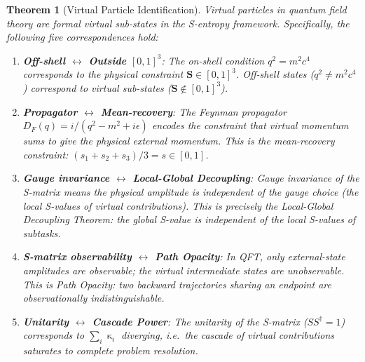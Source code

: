 \documentclass[twocolumn,10pt,a4paper]{article}
\theoremstyle{thmstyle}
\newtheorem{theorem}{Theorem}[section]
\theoremstyle{definition}
\theoremstyle{remark}
\DeclareMathOperator{\catpow}{\kappa}
\begin{document}
\begin{theorem}[Virtual Particle Identification]
\label{thm:virtual-id}
Virtual particles in quantum field theory are formal virtual sub-states
in the S-entropy framework. Specifically, the following five
correspondences hold:
\begin{enumerate}[leftmargin=1.5em,label=(\roman*),itemsep=0.2em]
\item \textbf{Off-shell $\leftrightarrow$ Outside $[0,1]^3$}: The
on-shell condition $q^2 = m^2 c^4$ corresponds to the physical
constraint $\mathbf{S} \in [0,1]^3$. Off-shell states ($q^2 \neq
m^2 c^4$) correspond to virtual sub-states ($\mathbf{S} \notin
[0,1]^3$).
\item \textbf{Propagator $\leftrightarrow$ Mean-recovery}: The Feynman
propagator $D_F(q) = i/(q^2 - m^2 + i\epsilon)$ encodes the
constraint that virtual momentum sums to give the physical external
momentum. This is the mean-recovery constraint: $(s_1+s_2+s_3)/3 =
s \in [0,1]$.
\item \textbf{Gauge invariance $\leftrightarrow$ Local-Global Decoupling}:
Gauge invariance of the S-matrix means the physical amplitude is
independent of the gauge choice (the local S-values of virtual
contributions). This is precisely the Local-Global Decoupling Theorem:
the global S-value is independent of the local S-values of
subtasks.
\item \textbf{S-matrix observability $\leftrightarrow$ Path Opacity}:
In QFT, only external-state amplitudes are observable; the virtual
intermediate states are unobservable. This is Path Opacity: two
backward trajectories sharing an endpoint are observationally
indistinguishable.
\item \textbf{Unitarity $\leftrightarrow$ Cascade Power}: The
unitarity of the S-matrix ($SS^\dagger = 1$) corresponds to
$\sum_i \catpow_i$ diverging, i.e.\ the cascade of virtual
contributions saturates to complete problem resolution.
\end{enumerate}
\end{theorem}
\end{document}
